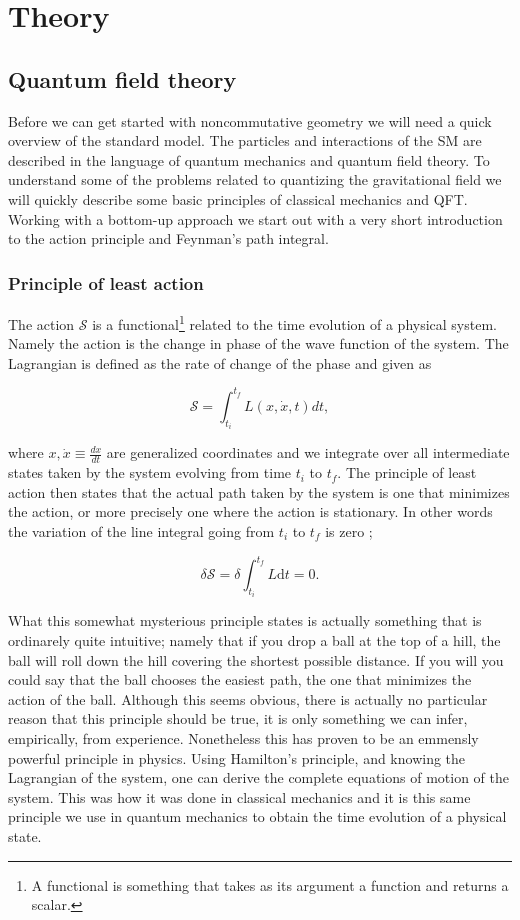 \section{Theory}
\subsection{Quantum field theory}
Before we can get started with noncommutative geometry we will need a quick overview of the standard model. The particles and interactions of the SM are described in the language of quantum mechanics and quantum field theory. To understand some of the problems related to quantizing the gravitational field we will quickly describe some basic principles of classical mechanics and QFT. Working with a bottom-up approach we start out with a very short introduction to the action principle and Feynman's path integral.

\subsubsection{Principle of least action}
The action $\mathcal{S}$ is a functional\footnote{A functional is something that takes as its argument a function and returns a scalar.} related to the time evolution of a physical system. Namely the action is the change in phase of the wave function of the system. The Lagrangian is defined as the rate of change of the phase and given as

\begin{equation}\label{eq:S}
	\mathcal{S} = \int_{t_i}^{t_f} L(x,\dot{x},t)dt,
\end{equation}

where $x, \dot{x} \equiv \frac{dx}{dt}$ are generalized coordinates and we integrate over all intermediate states taken by the system evolving from time $t_i$ to $t_f$. The principle of least action then states that the actual path taken by the system is one that minimizes the action, or more precisely one where the action is stationary. In other words the variation of the line integral going from $t_i$ to $t_f$ is zero \cite{goldstein1959};

\begin{equation}
	\delta \mathcal{S} = \delta \int_{t_i}^{t_f} L \textrm{d}t = 0.
\end{equation}

What this somewhat mysterious principle states is actually something that is ordinarely quite intuitive; namely that if you drop a ball at the top of a hill, the ball will roll down the hill covering the shortest possible distance. If you will you could say that the ball chooses the easiest path, the one that minimizes the action of the ball. Although this seems obvious, there is actually no particular reason that this principle should be true, it is only something we can infer, empirically, from experience. Nonetheless this has proven to be an emmensly powerful principle in physics. Using Hamilton's principle, and knowing the Lagrangian of the system, one can derive the complete equations of motion of the system. This was how it was done in classical mechanics and it is this same principle we use in quantum mechanics to obtain the time evolution of a physical state.

